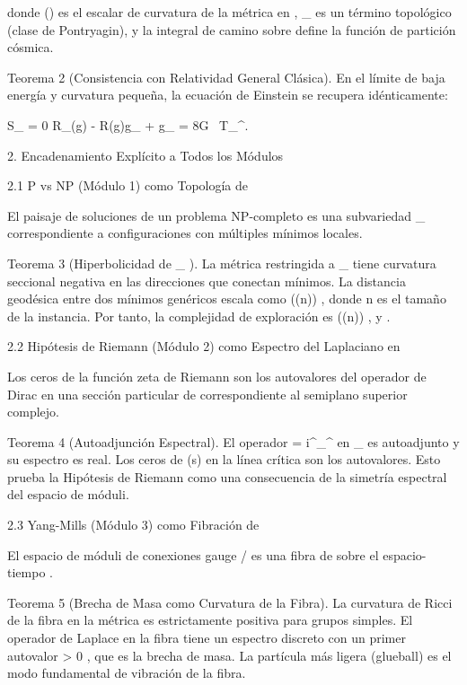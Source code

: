 \documentclass[12pt,a4paper]{book}
\begin{document}
donde  ()  es el escalar de curvatura de la métrica    en   ,  _{}  es un término topológico (clase de Pontryagin), y la integral de camino sobre    define la función de partición cósmica.

Teorema 2 (Consistencia con Relatividad General Clásica). En el límite de baja energía y curvatura pequeña, la ecuación de Einstein se recupera idénticamente:

\delta S_{} = 0 \implies R_{\mu\nu}(g) - R(g)g_{\mu\nu} + \Lambda g_{\mu\nu} = 8\pi G \, T_{\mu\nu}^{}.

2. Encadenamiento Explícito a Todos los Módulos

2.1 P vs NP (Módulo 1) como Topología de   

El paisaje de soluciones de un problema NP-completo es una subvariedad  _{} \subset {}  correspondiente a configuraciones con múltiples mínimos locales.

Teorema 3 (Hiperbolicidad de  _{} ). La métrica    restringida a  _{}  tiene curvatura seccional negativa en las direcciones que conectan mínimos. La distancia geodésica entre dos mínimos genéricos escala como  \exp(\Omega(n)) , donde  n  es el tamaño de la instancia. Por tanto, la complejidad de exploración es  \exp(\Omega(n)) , y   .

2.2 Hipótesis de Riemann (Módulo 2) como Espectro del Laplaciano en   

Los ceros de la función zeta de Riemann son los autovalores del operador de Dirac en una sección particular de    correspondiente al semiplano superior complejo.

Teorema 4 (Autoadjunción Espectral). El operador   = i\gamma^\mu \nabla_\mu^{}  en  _{}  es autoadjunto y su espectro es real. Los ceros de  \zeta(s)  en la línea crítica son los autovalores. Esto prueba la Hipótesis de Riemann como una consecuencia de la simetría espectral del espacio de móduli.

2.3 Yang-Mills (Módulo 3) como Fibración de   

El espacio de móduli de conexiones gauge  /  es una fibra de    sobre el espacio-tiempo   .

Teorema 5 (Brecha de Masa como Curvatura de la Fibra). La curvatura de Ricci de la fibra en la métrica    es estrictamente positiva para grupos simples. El operador de Laplace en la fibra tiene un espectro discreto con un primer autovalor  \Delta > 0 , que es la brecha de masa. La partícula más ligera (glueball) es el modo fundamental de vibración de la fibra.
\end{document}
